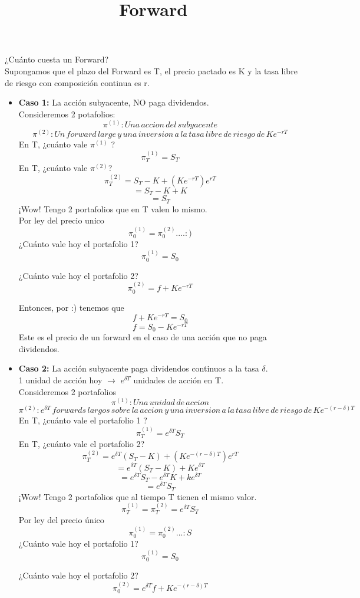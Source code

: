 \documentclass[12pts]{extarticle}
\author{}
\date{}
\title{Forward}
\begin{document}
\maketitle 
¿Cuánto cuesta un Forward? \\ Supongamos que el plazo del Forward es T, el precio pactado es K y la tasa libre de riesgo con composición continua es r. 
\begin{itemize}
\item \textbf{Caso 1:} La acción subyacente, NO paga dividendos. \\ Consideremos 2 potafolios: 
$$ \pi^{(1)}: Una \, accion \, del  \, subyacente $$ 
$$ \pi^{(2)}: Un \, forward \, large \, y \, una \, inversion \, a \, la \, tasa \, libre \, de \, riesgo \, de \, Ke^{-rT}$$
En T, ¿cuánto vale $\pi^{(1)}$ ? 
$$\pi_T^{(1)}=S_T$$
En T, ¿cuánto vale $\pi^{(2)}$? 
$$\pi_T^{(2)} =S_T-K +(Ke^{-rT})e^{rT}$$
$$=S_T-K+K$$
$$=S_T$$
¡Wow! Tengo 2 portafolios que en T valen lo mismo. \\ Por ley del precio unico $$\pi_0^{(1)}=\pi_0^{(2)} .... :)$$ 
¿Cuánto vale hoy el portafolio 1?
$$\pi_0^{(1)}=S_0$$

¿Cuánto vale hoy el portafolio 2?
$$\pi_0^{(2)}= f + Ke^{-rT}$$
  
 Entonces, por :) tenemos que 
$$f+Ke^{-rT}=S_0$$
$$f=S_0-Ke^{-rT}$$
Este es el precio de un forward en el caso de una acción que no paga dividendos. 

\item \textbf{Caso 2:} La acción subyacente paga dividendos continuos a la tasa $\delta$. \\
1 unidad de acción hoy $\rightarrow$ $e^{\delta T}$ unidades de acción en T. 
\\ Consideremos 2 portafolios 
$$ \pi^{(1)}: Una \, unidad \, de \, accion $$ 
$$ \pi^{(2)}: e^{\delta T} \, forwards \, largos\, sobre \, la \, accion  \, y \, una \, inversion \, a \, la \, tasa \, libre \, de \, riesgo \, de \, Ke^{-(r-\delta)T}$$
En T, ¿cuánto vale el portafolio 1 ? 
$$\pi_T^{(1)}=e^{\delta T} S_T$$
En T, ¿cuánto vale el portafolio 2? 
$$\pi_T^{(2)} =e^{\delta T}(S_T-K) +(Ke^{-(r-\delta)T})e^{rT}$$
$$=e^{\delta T}(S_T-K)+Ke^{\delta T}$$
$$=e^{\delta T}S_T-e^{\delta T}K+ke^{\delta T}$$
$$= e^{\delta T}S_T$$
¡Wow! Tengo 2 portafolios que al tiempo T tienen el mismo valor. 
$$\pi_T^{(1)}=\pi_T^{(2)}=e^{\delta T}S_T$$
Por ley del precio único
$$\pi_0^{(1)}=\pi_0^{(2)}... :S$$
¿Cuánto vale hoy el portafolio 1?
$$\pi_0^{(1)}=S_0$$

¿Cuánto vale hoy el portafolio 2?
$$\pi_0^{(2)}= e^{\delta T}f + Ke^{-(r-\delta)T}$$
  

\end{itemize}
\end{document}
